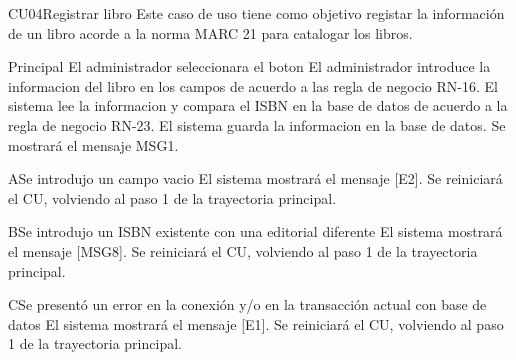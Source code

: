 \begin{UseCase}{CU04}{Registrar libro}{
		Este caso de uso tiene como objetivo registar la información de un libro acorde a la norma MARC 21 para catalogar los libros.
	}
\end{UseCase}
\begin{UCtrayectoria}{Principal}
	\UCpaso[\UCactor] El administrador seleccionara el boton 	
	\UCpaso[\UCactor] El administrador introduce la informacion del libro en los campos de acuerdo a las regla de negocio RN-16. 
	\UCpaso[\UCsist] El sistema lee la informacion y compara el ISBN en la base de datos de acuerdo a la regla de negocio RN-23. 
	\UCpaso[\UCsist] El sistema guarda la informacion en la base de datos. 
	\UCpaso[\UCsist] Se mostrará el mensaje MSG1.
\end{UCtrayectoria}
\begin{UCtrayectoriaA}{A}{Se introdujo un campo vacio}	
			\UCpaso[\UCsist] El sistema mostrará el mensaje [E2].
			\UCpaso[\UCsist] Se reiniciará el CU, volviendo al paso 1 de la trayectoria principal. 
\end{UCtrayectoriaA}
\begin{UCtrayectoriaA}{B}{Se introdujo un ISBN existente con una editorial diferente}	
			\UCpaso[\UCsist] El sistema mostrará el mensaje [MSG8].
			\UCpaso[\UCsist] Se reiniciará el CU, volviendo al paso 1 de la trayectoria principal. 
\end{UCtrayectoriaA}
\begin{UCtrayectoriaA}{C}{Se presentó un error en la conexión y/o en la transacción actual con base de datos}
			\UCpaso[\UCsist] El sistema mostrará el mensaje [E1].
			\UCpaso[\UCsist] Se reiniciará el CU, volviendo al paso 1 de la trayectoria principal.
\end{UCtrayectoriaA}